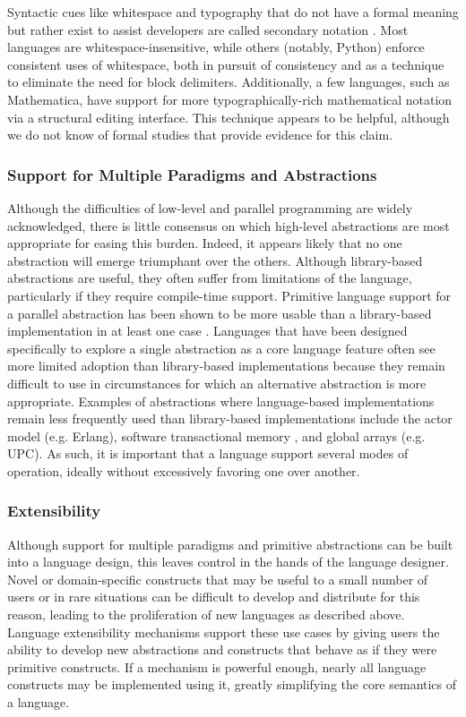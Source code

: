 \documentclass{llncs}
\begin{document}
Syntactic cues like whitespace and typography that do not have a formal meaning but rather exist to assist developers are called secondary notation \cite{green1990programming}. Most languages are whitespace-insensitive, while others (notably, Python) enforce consistent uses of whitespace, both in pursuit of consistency and as a technique to eliminate the need for block delimiters. Additionally, a few languages, such as Mathematica, have support for more typographically-rich mathematical notation via a structural editing interface. This technique appears to be helpful, although we do not know of formal studies that provide evidence for this claim.

\subsubsection{Support for Multiple Paradigms and Abstractions}\label{multiparadigm}
Although the difficulties of low-level and parallel programming are widely acknowledged, there is little consensus on which high-level abstractions are most appropriate for easing this burden. Indeed, it appears likely that no one abstraction will emerge triumphant over the others. Although library-based abstractions are useful, they often suffer from limitations of the language, particularly if they require compile-time support. Primitive language support for a parallel abstraction has been shown to be more usable than a library-based implementation in at least one case \cite{cave2010comparing}. 
Languages that have been designed specifically to explore a single abstraction as a core language feature often see more limited adoption than library-based implementations because they remain difficult to use in circumstances for which an alternative abstraction is more appropriate. Examples of abstractions where language-based implementations remain less frequently used than library-based implementations include the actor model (e.g. Erlang), software transactional memory \cite{harris2003language}, and global arrays (e.g. UPC). As such, it is important that a language support several modes of operation, ideally without excessively favoring one over another. 

\subsubsection{Extensibility}\label{extensions}

Although support for multiple paradigms and primitive abstractions can be built into a language design, this leaves control in the hands of the language designer. Novel or domain-specific constructs that may be useful to a small number of users or in rare situations can be difficult to develop and distribute for this reason, leading to the proliferation of new languages as  described above. Language extensibility mechanisms support these use cases by giving users the ability to develop new abstractions and constructs that behave as if they were primitive constructs. If a mechanism is powerful enough, nearly all language constructs may be implemented using it, greatly simplifying the core semantics of a language.
\end{document}
